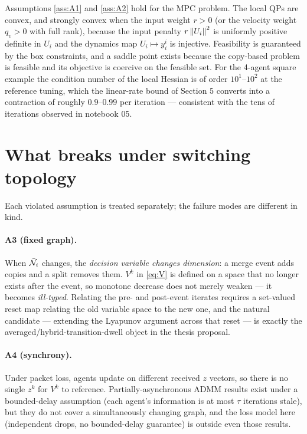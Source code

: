 \documentclass[11pt]{article}
\begin{document}
Assumptions \ref{ass:A1} and \ref{ass:A2} hold for the MPC problem. The local QPs are
convex, and strongly convex when the input weight $r > 0$ (or the velocity weight
$q_v > 0$ with full rank), because the input penalty $r\left\lVert U_i \right\rVert^2$ is uniformly positive
definite in $U_i$ and the dynamics map $U_i \mapsto y_i^i$ is injective. Feasibility is
guaranteed by the box constraints, and a saddle point exists because the copy-based
problem is feasible and its objective is coercive on the feasible set. For the 4-agent
square example the condition number of the local Hessian is of order $10^1$--$10^2$ at the
reference tuning, which the linear-rate bound of Section 5 converts into a contraction of
roughly $0.9$--$0.99$ per iteration --- consistent with the tens of iterations observed in
notebook 05.

\section{What breaks under switching topology}
\label{sec:breaks}

Each violated assumption is treated separately; the failure modes are different in kind.

\paragraph{A3 (fixed graph).} When $\bar{\mathcal{N}}_i$ changes, the \emph{decision variable changes
dimension}: a merge event adds copies and a split removes them. $V^k$ in \eqref{eq:V} is
defined on a space that no longer exists after the event, so monotone decrease does not
merely weaken --- it becomes \emph{ill-typed}. Relating the pre- and post-event iterates
requires a set-valued reset map relating the old variable space to the new one, and the
natural candidate --- extending the Lyapunov argument across that reset --- is exactly the
averaged/hybrid-transition-dwell object in the thesis proposal.

\paragraph{A4 (synchrony).} Under packet loss, agents update on different received $z$
vectors, so there is no single $z^k$ for $V^k$ to reference. Partially-asynchronous ADMM
results exist under a bounded-delay assumption (each agent's information is at most $\tau$
iterations stale), but they do not cover a simultaneously changing graph, and the loss
model here (independent drops, no bounded-delay guarantee) is outside even those results.
\end{document}

